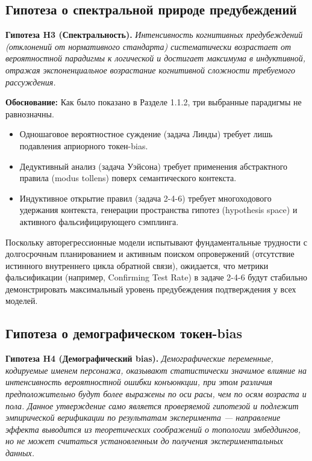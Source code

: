 \subsection{Гипотеза о спектральной природе предубеждений}

\textbf{Гипотеза H3 (Спектральность).} \textit{Интенсивность когнитивных предубеждений (отклонений от нормативного стандарта) систематически возрастает от вероятностной парадигмы к логической и достигает максимума в индуктивной, отражая экспоненциальное возрастание когнитивной сложности требуемого рассуждения.}

\textbf{Обоснование:} Как было показано в Разделе 1.1.2, три выбранные парадигмы не равнозначны. 
\begin{itemize}
    \item Одношаговое вероятностное суждение (задача Линды) требует лишь подавления априорного токен-bias.
    \item Дедуктивный анализ (задача Уэйсона) требует применения абстрактного правила (modus tollens) поверх семантического контекста.
    \item Индуктивное открытие правил (задача 2-4-6) требует многоходового удержания контекста, генерации пространства гипотез (hypothesis space) и активного фальсифицирующего сэмплинга.
\end{itemize}
Поскольку авторегрессионные модели испытывают фундаментальные трудности с долгосрочным планированием и активным поиском опровержений (отсутствие истинного внутреннего цикла обратной связи), ожидается, что метрики фальсификации (например, Confirming Test Rate) в задаче 2-4-6 будут стабильно демонстрировать максимальный уровень предубеждения подтверждения у всех моделей.

\subsection{Гипотеза о демографическом токен-bias}

\textbf{Гипотеза H4 (Демографический bias).} \textit{Демографические переменные, кодируемые именем персонажа, оказывают статистически значимое влияние на интенсивность вероятностной ошибки конъюнкции, при этом различия предположительно будут более выражены по оси расы, чем по осям возраста и пола. Данное утверждение само является проверяемой гипотезой и подлежит эмпирической верификации по результатам эксперимента --- направление эффекта выводится из теоретических соображений о топологии эмбеддингов, но не может считаться установленным до получения экспериментальных данных.}

